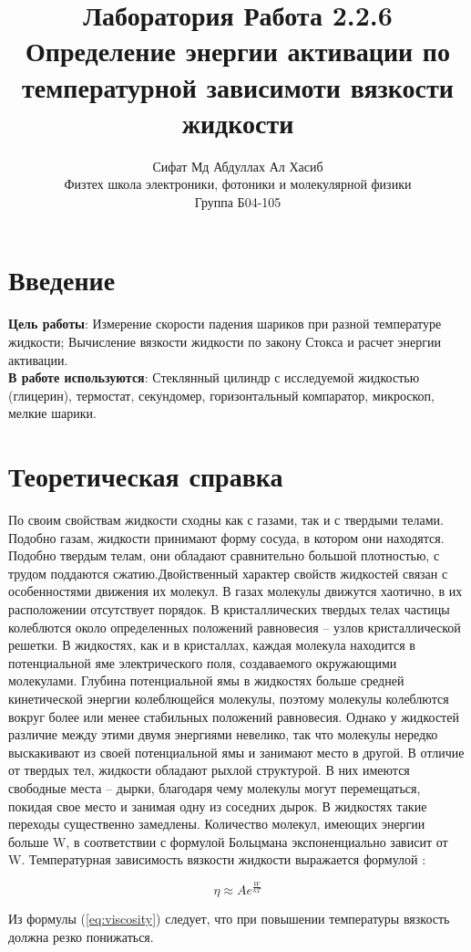 \documentclass[a4paper, 12pt]{article}%
\author{Сифат Мд Абдуллах Ал Хасиб \\
Физтех школа электроники, фотоники и молекулярной физики \\
Группа Б04-105}
\title{\textbf{Лаборатория Работа 2.2.6 \\ Определение энергии активации по температурной зависимоти вязкости жидкости}}
\begin{document}
\maketitle
\section{Введение}\textbf{Цель работы}: Измерение скорости падения шариков при разной температуре жидкости; Вычисление вязкости жидкости по закону Стокса и расчет энергии активации.\\
\textbf{В работе используются}: Стеклянный цилиндр с исследуемой жидкостью (глицерин), термостат, секундомер, горизонтальный компаратор, микроскоп, мелкие шарики.
\section{Теоретическая справка}
По своим свойствам жидкости сходны как с газами, так и с твердыми телами. Подобно газам, жидкости принимают форму сосуда, в котором они находятся. Подобно твердым телам, они обладают сравнительно большой плотностью, с трудом поддаются сжатию.Двойственный характер свойств жидкостей связан с особенностями движения их молекул. В газах молекулы движутся хаотично, в их расположении отсутствует порядок. В кристаллических твердых
телах частицы колеблются около определенных положений равновесия -- узлов кристаллической решетки. В жидкостях, как и в кристаллах, каждая молекула находится в потенциальной яме электрического поля, создаваемого окружающими молекулами. Глубина потенциальной ямы в жидкостях больше средней кинетической энергии колеблющейся молекулы, поэтому молекулы колеблются вокруг более или менее стабильных положений равновесия. Однако у жидкостей различие между этими двумя энергиями невелико, так что молекулы нередко выскакивают из своей потенциальной ямы и занимают место в другой. В отличие от твердых тел, жидкости обладают  рыхлой структурой. В них имеются свободные места  -- дырки, благодаря чему молекулы могут перемещаться, покидая свое место и занимая одну из соседних дырок. В жидкостях такие переходы существенно замедлены. Количество молекул, имеющих энергии больше W, в соответствии с формулой Больцмана экспоненциально зависит от W. Температурная зависимость вязкости жидкости выражается формулой :

$$ \eta \approx Ae^{\frac{W}{kT}}$$\label{eq:viscosity}

Из формулы (\ref{eq:viscosity}) следует, что при повышении температуры вязкость должна резко понижаться.
\end{document}
